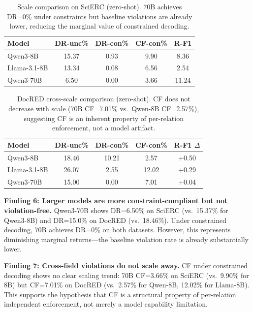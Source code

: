 \documentclass[11pt]{article}
\begin{document}
\begin{table}[t]
\centering
\small
\caption{Scale comparison on SciERC (zero-shot). 70B achieves DR=0\% under constraints but baseline violations are already lower, reducing the marginal value of constrained decoding.}
\label{tab:scale_scierc}
\begin{tabular}{lcccc}
\toprule
\textbf{Model} & \textbf{DR-unc\%} & \textbf{DR-con\%} & \textbf{CF-con\%} & \textbf{R-F1} \\
\midrule
Qwen3-8B     & 15.37 & 0.93 & 9.90 & 8.36 \\
Llama-3.1-8B & 13.34 & 0.08 & 6.56 & 2.54 \\
Qwen3-70B    & 6.50  & 0.00 & 3.66 & 11.24 \\
\bottomrule
\end{tabular}
\end{table}

\begin{table}[t]
\centering
\small
\caption{DocRED cross-scale comparison (zero-shot). CF does not decrease with scale (70B CF=7.01\% vs.\ Qwen-8B CF=2.57\%), suggesting CF is an inherent property of per-relation enforcement, not a model artifact.}
\label{tab:scale_docred}
\begin{tabular}{lcccc}
\toprule
\textbf{Model} & \textbf{DR-unc\%} & \textbf{DR-con\%} & \textbf{CF-con\%} & \textbf{R-F1 $\Delta$} \\
\midrule
Qwen3-8B     & 18.46 & 10.21 & 2.57  & +0.50 \\
Llama-3.1-8B & 26.07 & 2.55  & 12.02 & +0.29 \\
Qwen3-70B    & 15.00 & 0.00  & 7.01  & +0.04 \\
\bottomrule
\end{tabular}
\end{table}

\textbf{Finding 6: Larger models are more constraint-compliant but not violation-free.}
Qwen3-70B shows DR=6.50\% on SciERC (vs.\ 15.37\% for Qwen3-8B) and DR=15.0\% on DocRED (vs.\ 18.46\%).
Under constrained decoding, 70B achieves DR=0\% on both datasets.
However, this represents diminishing marginal returns---the baseline violation rate is already substantially lower.

\textbf{Finding 7: Cross-field violations do not scale away.}
CF under constrained decoding shows no clear scaling trend: 70B CF=3.66\% on SciERC (vs.\ 9.90\% for 8B) but CF=7.01\% on DocRED (vs.\ 2.57\% for Qwen-8B, 12.02\% for Llama-8B).
This supports the hypothesis that CF is a structural property of per-relation independent enforcement, not merely a model capability limitation.
\end{document}
